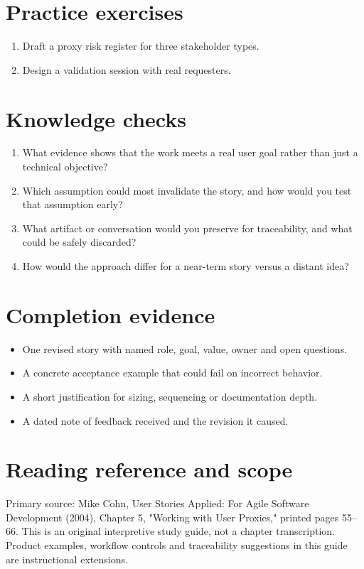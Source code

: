 \documentclass[11pt,letterpaper]{article}
\begin{document}
\section{Practice exercises}
\begin{enumerate}[leftmargin=*,itemsep=3pt]
\item Draft a proxy risk register for three stakeholder types.
\item Design a validation session with real requesters.
\end{enumerate}
\section{Knowledge checks}
\begin{enumerate}[leftmargin=*,itemsep=3pt]
\item What evidence shows that the work meets a real user goal rather than just a technical objective?
\item Which assumption could most invalidate the story, and how would you test that assumption early?
\item What artifact or conversation would you preserve for traceability, and what could be safely discarded?
\item How would the approach differ for a near-term story versus a distant idea?
\end{enumerate}
\section{Completion evidence}
\begin{itemize}[leftmargin=*,itemsep=2pt]
\item One revised story with named role, goal, value, owner and open questions.
\item A concrete acceptance example that could fail on incorrect behavior.
\item A short justification for sizing, sequencing or documentation depth.
\item A dated note of feedback received and the revision it caused.
\end{itemize}
\section{Reading reference and scope}
Primary source: Mike Cohn, User Stories Applied: For Agile Software Development (2004), Chapter 5, "Working with User Proxies," printed pages 55–66. This is an original interpretive study guide, not a chapter transcription. Product examples, workflow controls and traceability suggestions in this guide are instructional extensions.
\end{document}
